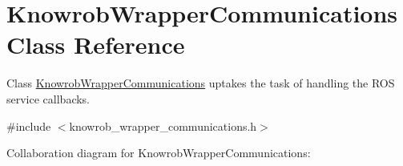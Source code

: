\hypertarget{classKnowrobWrapperCommunications}{\section{Knowrob\-Wrapper\-Communications Class Reference}
\label{classKnowrobWrapperCommunications}
}


Class \hyperlink{classKnowrobWrapperCommunications}{Knowrob\-Wrapper\-Communications} uptakes the task of handling the R\-O\-S service callbacks.  




{\ttfamily \#include $<$knowrob\-\_\-wrapper\-\_\-communications.\-h$>$}



Collaboration diagram for Knowrob\-Wrapper\-Communications\-:
